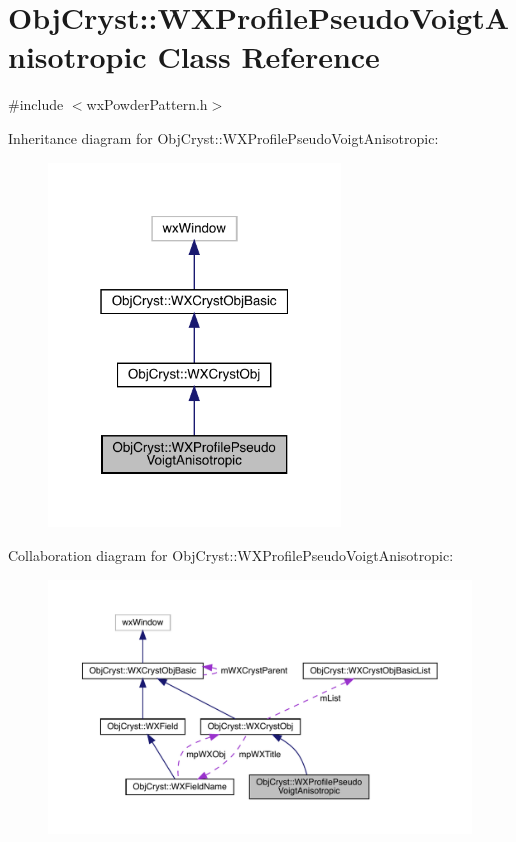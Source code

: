 \hypertarget{class_obj_cryst_1_1_w_x_profile_pseudo_voigt_anisotropic}{}\section{Obj\+Cryst\+::W\+X\+Profile\+Pseudo\+Voigt\+Anisotropic Class Reference}
\label{class_obj_cryst_1_1_w_x_profile_pseudo_voigt_anisotropic}


{\ttfamily \#include $<$wx\+Powder\+Pattern.\+h$>$}



Inheritance diagram for Obj\+Cryst\+::W\+X\+Profile\+Pseudo\+Voigt\+Anisotropic\+:
\nopagebreak
\begin{figure}[H]
\begin{center}
\leavevmode
\includegraphics[width=220pt]{class_obj_cryst_1_1_w_x_profile_pseudo_voigt_anisotropic__inherit__graph}
\end{center}
\end{figure}


Collaboration diagram for Obj\+Cryst\+::W\+X\+Profile\+Pseudo\+Voigt\+Anisotropic\+:
\nopagebreak
\begin{figure}[H]
\begin{center}
\leavevmode
\includegraphics[width=350pt]{class_obj_cryst_1_1_w_x_profile_pseudo_voigt_anisotropic__coll__graph}
\end{center}
\end{figure}
